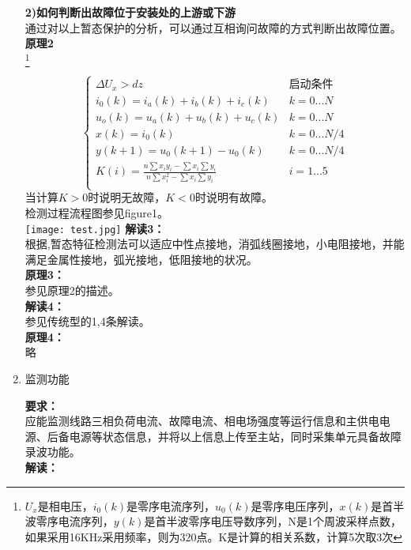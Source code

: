 \documentclass{article}
\begin{document}
\begin{CJK}{UTF8}{gbsn}
\begin{enumerate}
\begin{itemize}
\begin{itemize}
			\end{itemize}
	\end{itemize}
	\textbf{2)如何判断出故障位于安装处的上游或下游}\\
	通过对以上暂态保护的分析，可以通过互相询问故障的方式判断出故障位置。\\
	\textbf{原理2}\\
		\footnote{$U_x$是相电压，$i_0(k)$是零序电流序列，$u_0(k)$是零序电压序列，$x(k)$是首半波零序电流序列，$y(k)$是首半波零序电压导数序列，N是1个周波采样点数，如果采用16KHz采用频率，则为320点。K是计算的相关系数，计算5次取3次}
	\par
		$$
			\left\{	
				\begin{array}{ll}
				\Delta U_x>dz & \textrm{启动条件}\\
				i_0(k)=i_a(k) + i_b(k) + i_c(k) & k=0...N \\
				u_o(k)=u_a(k)+u_b(k)+u_c(k) & k=0...N \\
				x(k)=i_0(k) & k=0...N/4 \\
				y(k+1)=u_0(k+1)-u_0(k) & k=0...N/4 \\
				K(i)=\frac{n\sum{x_i y_i}-\sum x_i\sum y_i}{n\sum x_i^2 - \sum x_i \sum y_i} & i=1...5\\
				\end{array}
			\right.
		$$
		当计算$K>0$时说明无故障，$K<0$时说明有故障。\\
		检测过程流程图参见figure1。\\
		\texttt{[image: test.jpg]}
		\textbf{解读3：}\\
		根据\cite{p1},暂态特征检测法可以适应中性点接地，消弧线圈接地，小电阻接地，并能满足金属性接地，弧光接地，低阻接地的状况。\\
		\textbf{原理3：}\\
		参见原理2的描述。\\
		\textbf{解读4：}\\
		参见传统型的1,4条解读。\\
		\textbf{原理4：}\\
		略
	\item 监测功能
		\par
		\textbf{要求：}\\
		应能监测线路三相负荷电流、故障电流、相电场强度等运行信息和主供电电源、后备电源等状态信息，并将以上信息上传至主站，同时采集单元具备故障录波功能。\\		\textbf{解读：}\\

\end{enumerate}
\end{CJK}
\end{document}
